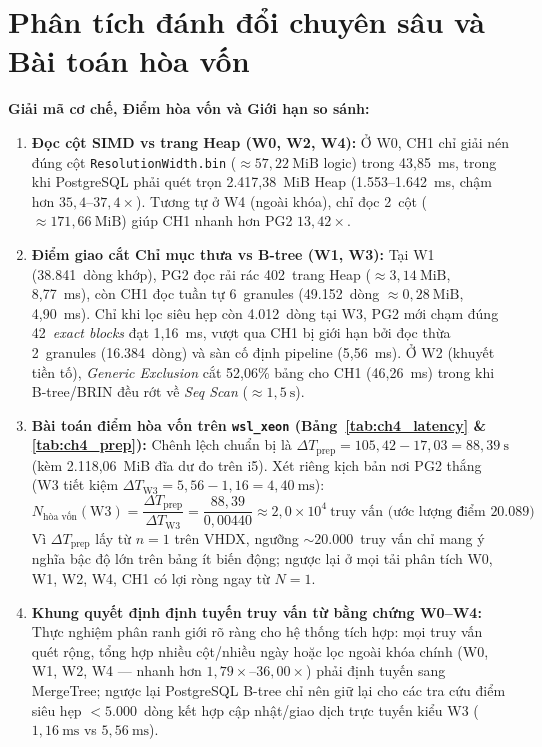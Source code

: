 \documentclass[13pt,a4paper]{report}
\begin{document}
\section{Phân tích đánh đổi chuyên sâu và Bài toán hòa vốn}
\noindent\textbf{Giải mã cơ chế, Điểm hòa vốn và Giới hạn so sánh:}
\begin{enumerate}
    \setlength{\itemsep}{2pt}\setlength{\parskip}{0pt}
    \item \textbf{Đọc cột SIMD vs trang Heap (W0, W2, W4):} Ở W0, CH1 chỉ giải nén đúng cột \texttt{ResolutionWidth.bin} ($\approx 57{,}22~\text{MiB}$ logic) trong 43,85~ms, trong khi PostgreSQL phải quét trọn 2.417,38~MiB Heap (1.553--1.642~ms, chậm hơn $35{,}4\text{--}37{,}4{\times}$). Tương tự ở W4 (ngoài khóa), chỉ đọc 2~cột ($\approx 171{,}66~\text{MiB}$) giúp CH1 nhanh hơn PG2 $13{,}42{\times}$.
    \item \textbf{Điểm giao cắt Chỉ mục thưa vs B-tree (W1, W3):} Tại W1 (38.841~dòng khớp), PG2 đọc rải rác 402~trang Heap ($\approx 3{,}14~\text{MiB}$, 8,77~ms), còn CH1 đọc tuần tự 6~granules (49.152~dòng $\approx 0{,}28~\text{MiB}$, 4,90~ms). Chỉ khi lọc siêu hẹp còn 4.012~dòng tại W3, PG2 mới chạm đúng 42~\textit{exact blocks} đạt 1,16~ms, vượt qua CH1 bị giới hạn bởi đọc thừa 2~granules (16.384~dòng) và sàn cố định pipeline (5,56~ms). Ở W2 (khuyết tiền tố), \textit{Generic Exclusion} cắt 52,06\% bảng cho CH1 (46,26~ms) trong khi B-tree/BRIN đều rớt về \textit{Seq Scan} ($\approx 1{,}5~\text{s}$).
    \item \textbf{Bài toán điểm hòa vốn trên \texttt{wsl\_\allowbreak{}xeon} (Bảng~\ref{tab:ch4_latency} \& \ref{tab:ch4_prep}):} Chênh lệch chuẩn bị là $\Delta T_{\text{prep}} = 105{,}42 - 17{,}03 = 88{,}39~\text{s}$ (kèm 2.118,06~MiB đĩa dư đo trên i5). Xét riêng kịch bản nơi PG2 thắng (W3 tiết kiệm $\Delta T_{\text{W3}} = 5{,}56 - 1{,}16 = 4{,}40~\text{ms}$):
    \[
        N_{\text{hòa vốn}}(\text{W3}) = \frac{\Delta T_{\text{prep}}}{\Delta T_{\text{W3}}} = \frac{88{,}39}{0{,}00440} \approx 2{,}0 \times 10^4~\text{truy vấn (ước lượng điểm } 20.089\text{)}
    \]
    Vì $\Delta T_{\text{prep}}$ lấy từ $n = 1$ trên VHDX, ngưỡng $\sim 20.000$~truy vấn chỉ mang ý nghĩa bậc độ lớn trên bảng ít biến động; ngược lại ở mọi tải phân tích W0, W1, W2, W4, CH1 có lợi ròng ngay từ $N = 1$.
    \item \textbf{Khung quyết định định tuyến truy vấn từ bằng chứng W0--W4:} Thực nghiệm phân ranh giới rõ ràng cho hệ thống tích hợp: mọi truy vấn quét rộng, tổng hợp nhiều cột/nhiều ngày hoặc lọc ngoài khóa chính (W0, W1, W2, W4 --- nhanh hơn $1{,}79{\times}\text{--}36{,}00{\times}$) phải định tuyến sang MergeTree; ngược lại PostgreSQL B-tree chỉ nên giữ lại cho các tra cứu điểm siêu hẹp $< 5.000$~dòng kết hợp cập nhật/giao dịch trực tuyến kiểu W3 ($1{,}16~\text{ms}$ vs $5{,}56~\text{ms}$).
\end{enumerate}
\end{document}
